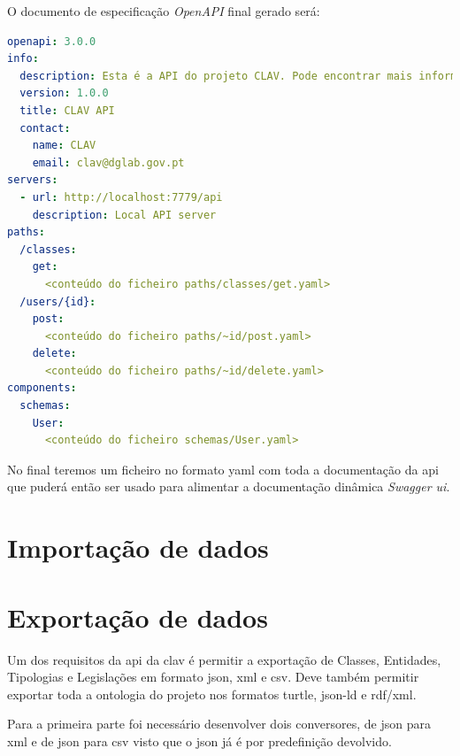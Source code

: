 O documento de especificação \textit{OpenAPI} final gerado será:
\begin{lstlisting}[language=yaml, caption=Documento de especificação \textit{OpenAPI} gerado a partir do ficheiro \textit{index.yaml} com o uso da \textit{package} \texttt{yaml-include}, label=exem:yamlif]
openapi: 3.0.0
info:
  description: Esta é a API do projeto CLAV. Pode encontrar mais informação sobre o CLAV em [http://clav.dglab.gov.pt](http://clav.dglab.gov.pt).
  version: 1.0.0
  title: CLAV API
  contact:
    name: CLAV
    email: clav@dglab.gov.pt
servers:
  - url: http://localhost:7779/api
    description: Local API server
paths:
  /classes:
    get:
      <conteúdo do ficheiro paths/classes/get.yaml>
  /users/{id}:
    post:
      <conteúdo do ficheiro paths/~id/post.yaml>
    delete:
      <conteúdo do ficheiro paths/~id/delete.yaml>
components:
  schemas:
    User:
      <conteúdo do ficheiro schemas/User.yaml>
\end{lstlisting}

No final teremos um ficheiro no formato \acrshort{yaml} com toda a documentação da \acrshort{api} que puderá então ser usado para alimentar a documentação dinâmica \textit{Swagger \acrshort{ui}}.

\section{Importação de dados}

\section{Exportação de dados}
Um dos requisitos da \acrshort{api} da \acrshort{clav} é permitir a exportação de Classes, Entidades, Tipologias e Legislações em formato \acrshort{json}, \acrshort{xml} e \acrshort{csv}. Deve também permitir exportar toda a ontologia do projeto nos formatos \acrshort{turtle}, \acrshort{json-ld} e \acrshort{rdf}/\acrshort{xml}.

Para a primeira parte foi necessário desenvolver dois conversores, de \acrshort{json} para \acrshort{xml} e de \acrshort{json} para \acrshort{csv} visto que o \acrshort{json} já é por predefinição devolvido.

